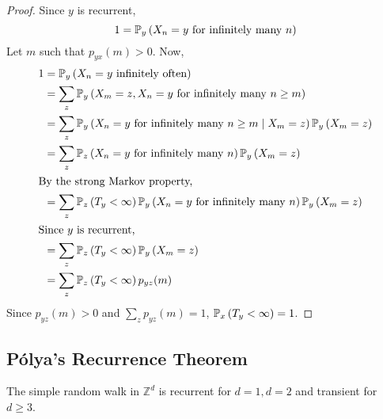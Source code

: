 \begin{proof}
	Since \( y \) is recurrent,
	\[
		1 = \mathbb{P}_{y}\left({X_n = y \text{ for infinitely many } n}\right)
	\]
	Let \( m \) such that \( p_{yx}(m) > 0 \).
	Now,
	\begin{align*}
		1 & = \mathbb{P}_{y}\left({X_n = y \text{ infinitely often}}\right)                                                       \\
		  & = \sum_z \mathbb{P}_{y}\left({X_m = z, X_n = y \text{ for infinitely many } n \geq m}\right)                          \\
		  & = \sum_z \mathbb{P}_{y}\left({X_n = y \text{ for infinitely many } n \geq m \mid X_m = z}\right) \mathbb{P}_{y}\left({X_m = z}\right)    \\
		  & = \sum_z \mathbb{P}_{z}\left({X_n = y \text{ for infinitely many } n}\right) \mathbb{P}_{y}\left({X_m = z}\right)                        \\
		\intertext{By the strong Markov property,}
		  & = \sum_z \mathbb{P}_{z}\left({T_y < \infty}\right) \mathbb{P}_{y}\left({X_n = y \text{ for infinitely many } n}\right) \mathbb{P}_{y}\left({X_m = z}\right) \\
		\intertext{Since \( y \) is recurrent,}
		  & = \sum_z \mathbb{P}_{z}\left({T_y < \infty}\right) \mathbb{P}_{y}\left({X_m = z}\right)                                                  \\
		  & = \sum_z \mathbb{P}_{z}\left({T_y < \infty}\right) p_{yz}(m)
	\end{align*}
	Since \( p_{yz}(m) > 0 \) and \( \sum_z p_{yz}(m) = 1 \), \( \mathbb{P}_{x}\left({T_y < \infty}\right) = 1 \).
\end{proof}

\subsection{P\'olya's Recurrence Theorem}
\begin{theorem}
	The simple random walk in \( \mathbb Z^d \) is recurrent for \( d = 1, d = 2 \) and transient for \( d \geq 3 \).
\end{theorem}
